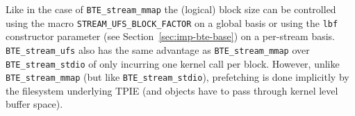 Like in the case of \lstinline|BTE_stream_mmap| the (logical) block
size can be controlled using the macro
\lstinline|STREAM_UFS_BLOCK_FACTOR| on a global basis or using the
\lstinline|lbf| constructor parameter (see
Section~\ref{sec:imp-bte-base}) on a per-stream basis.
\lstinline|BTE_stream_ufs| also has the same advantage as
\lstinline|BTE_stream_mmap| over \lstinline|BTE_stream_stdio| of only
incurring one kernel call per block. However, unlike
\lstinline|BTE_stream_mmap| (but like \lstinline|BTE_stream_stdio|),
prefetching is done implicitly by the filesystem underlying TPIE (and
objects have to pass through kernel level buffer space).



  
